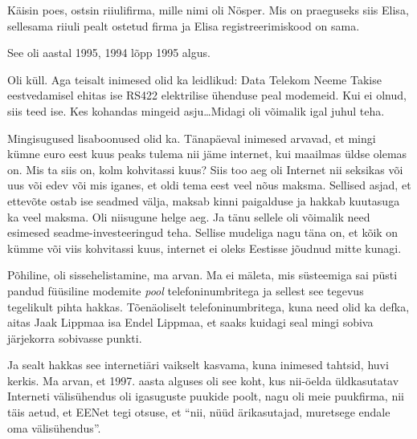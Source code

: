 Käisin poes, ostsin riiulifirma, mille nimi oli 
Nösper. Mis  on praeguseks siis Elisa, sellesama  
riiuli pealt ostetud firma ja Elisa registreerimiskood on sama. 


See oli aastal 1995, 1994 lõpp 1995 algus.


Oli küll. Aga teisalt inimesed olid ka leidlikud: Data Telekom Neeme Takise eestvedamisel ehitas ise RS422 
elektrilise ühenduse peal modemeid. Kui ei olnud, siis teed ise. Kes kohandas 
mingeid asju\ldots Midagi oli võimalik igal juhul teha.


Mingisugused lisaboonused olid ka. Tänapäeval inimesed arvavad, et mingi kümne 
euro eest kuus peaks tulema nii jäme internet, kui maailmas üldse olemas on. 
Mis ta siis on, kolm kohvitassi kuus? Siis too aeg oli Internet nii  seksikas 
või uus või edev või mis iganes, et oldi tema eest veel nõus maksma. Sellised 
asjad, et ettevõte ostab ise seadmed välja, maksab kinni paigalduse ja hakkab 
kuutasuga ka veel maksma. Oli niisugune helge aeg. Ja  tänu sellele oli 
võimalik need esimesed seadme-investeeringud teha. Sellise mudeliga nagu täna 
on, et kõik on kümme või viis kohvitassi kuus, internet ei oleks Eestisse 
jõudnud mitte kunagi.


Põhiline, oli sissehelistamine, ma arvan. Ma ei mäleta, mis süsteemiga sai 
püsti pandud füüsiline modemite \emph{pool} telefoninumbritega  ja sellest see 
tegevus tegelikult pihta hakkas. Tõenäoliselt telefoninumbritega, kuna need 
olid ka defka, aitas Jaak Lippmaa isa Endel 
Lippmaa, et saaks kuidagi seal mingi sobiva 
järjekorra sobivasse punkti.

Ja sealt  hakkas see internetiäri vaikselt kasvama, kuna inimesed tahtsid, huvi 
kerkis. Ma arvan, et 1997.  aasta alguses oli see koht, kus  nii-öelda 
üldkasutatav Interneti välisühendus oli igasuguste puukide poolt, nagu oli meie 
puukfirma, nii täis aetud, et EENet tegi otsuse, et \enquote{nii, 
nüüd ärikasutajad, muretsege endale oma välisühendus}.


